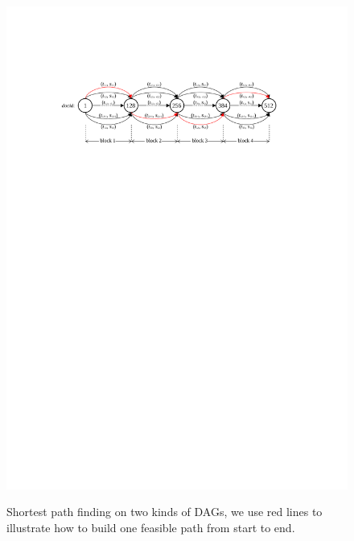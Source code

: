 \documentclass{sig-alternate-05-2015}
\begin{document}
\begin{figure}
{		\includegraphics[width=1.0\linewidth]{rcsp}
	}
	
	\caption{Shortest path finding on two kinds of DAGs, we use red lines to illustrate how to build one feasible path from start to end.}
	\label{fig: DAG}
\end{figure}
\end{document}
